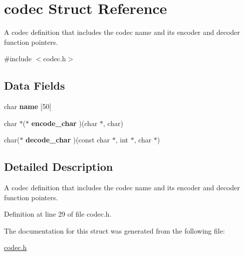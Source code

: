 \hypertarget{structcodec}{
\section{codec Struct Reference}
\label{structcodec}
}


A codec definition that includes the codec name and its encoder and decoder function pointers.  




{\ttfamily \#include $<$codec.h$>$}

\subsection*{Data Fields}
\begin{DoxyCompactItemize}
\item 
\hypertarget{structcodec_a6177c922a0e9535e36b5111b24ca78ec}{
char {\bfseries name} \mbox{[}50\mbox{]}}
\label{structcodec_a6177c922a0e9535e36b5111b24ca78ec}

\item 
\hypertarget{structcodec_a98fdc9c4c5be44d69f72aa366ffea931}{
char $\ast$($\ast$ {\bfseries encode\_\-char} )(char $\ast$, char)}
\label{structcodec_a98fdc9c4c5be44d69f72aa366ffea931}

\item 
\hypertarget{structcodec_a2faf0e3d1c11f1b39af9d4c2efd07ca6}{
char($\ast$ {\bfseries decode\_\-char} )(const char $\ast$, int $\ast$, char $\ast$)}
\label{structcodec_a2faf0e3d1c11f1b39af9d4c2efd07ca6}

\end{DoxyCompactItemize}


\subsection{Detailed Description}
A codec definition that includes the codec name and its encoder and decoder function pointers. 

Definition at line 29 of file codec.h.



The documentation for this struct was generated from the following file:\begin{DoxyCompactItemize}
\item 
\hyperlink{codec_8h}{codec.h}\end{DoxyCompactItemize}
